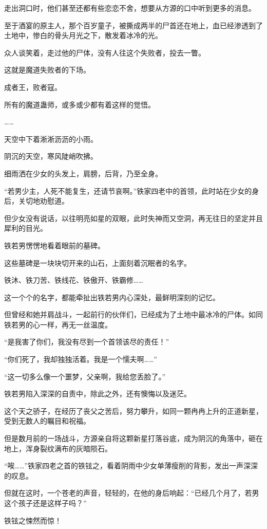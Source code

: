 \begin{this_body}
走出洞口时，他们甚至还都有些恋恋不舍，想要从方源的口中听到更多的消息。

至于酒宴的原主人，那个百岁童子，被撕成两半的尸首还在地上，血已经渗透到了土地中，惨白的骨头月光之下，散发着冰冷的光。

众人谈笑着，走过他的尸体，没有人往这个失败者，投去一瞥。

这就是魔道失败者的下场。

成者王，败者寇。

所有的魔道蛊师，或多或少都有着这样的觉悟。

……

天空中下着淅淅沥沥的小雨。

阴沉的天空，寒风陡峭吹拂。

细雨洒在少女的头发上，肩膀，后背，乃至全身。

“若男少主，人死不能复生，还请节哀啊。”铁家四老中的首领，此时站在少女的身后，关切地劝慰道。

但少女没有说话，以往明亮如星的双眼，此时失神而又空洞，再无往日的坚定并且犀利的目光。

铁若男愣愣地看着眼前的墓碑。

这些墓碑是一块块切开来的山石，上面刻着沉眠者的名字。

铁沐、铁刀苦、铁线花、铁傲开、铁霸修……

这一个个的名字，都能牵扯出铁若男内心深处，最鲜明深刻的记忆。

但曾经和她并肩战斗，一起前行的伙伴们，已经成为了土地中最冰冷的尸体。如同铁若男的心一样，再无一丝温度。

“是我害了你们，我没有尽到一个首领该尽的责任！”

“你们死了，我却独独活着。我是一个懦夫啊……”

“这一切多么像一个噩梦，父亲啊，我给您丢脸了。”

铁若男陷入深深的自责中，除此之外，还有懊悔以及迷茫。

这个天之骄子，在经历了丧父之苦后，努力攀升，如同一颗冉冉上升的正道新星，受到无数人的瞩目和祝福。

但是数月前的一场战斗，方源亲自将这颗新星打落谷底，成为阴沉的角落中，砸在地上，浑身裂纹满布的灰暗陨石。

“唉……”铁家四老之首的铁铉之，看着阴雨中少女单薄瘦削的背影，发出一声深深的叹息。

但就在这时，一个苍老的声音，轻轻的，在他的身后响起：“已经几个月了，若男这个孩子还是这样子吗？”

铁铉之悚然而惊！


\end{this_body}
